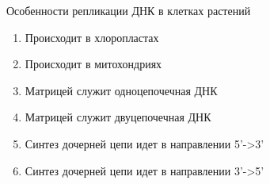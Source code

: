 
Особенности репликации ДНК в клетках
растений

\begin{enumerate}
    \item Происходит в хлоропластах 
    \item Происходит в митохондриях 
    \item Матрицей служит одноцепочечная ДНК 
    \item Матрицей служит двуцепочечная ДНК 
    \item Синтез дочерней цепи идет в направлении 5’->3’
    \item Синтез дочерней цепи идет в направлении 3’->5’
\end{enumerate}

\explanationSection

